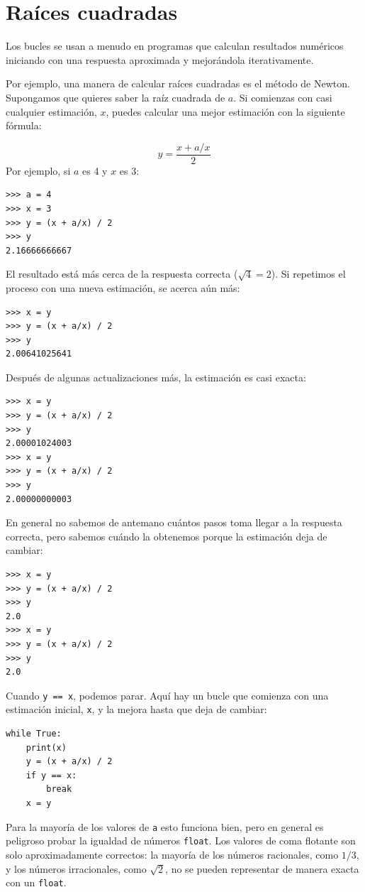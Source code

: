 \documentclass[10pt]{book}
\begin{document}
\section{Raíces cuadradas}
\label{squareroot}

Los bucles se usan a menudo en programas que calculan
resultados numéricos iniciando con una respuesta aproximada y
mejorándola iterativamente.

Por ejemplo, una manera de calcular raíces cuadradas es el método de Newton.
Supongamos que quieres saber la raíz cuadrada de $a$.  Si comienzas
con casi cualquier estimación, $x$, puedes calcular una mejor
estimación con la siguiente fórmula:

\[ y = \frac{x + a/x}{2} \]
%
Por ejemplo, si $a$ es 4 y $x$ es 3:

\begin{verbatim}
>>> a = 4
>>> x = 3
>>> y = (x + a/x) / 2
>>> y
2.16666666667
\end{verbatim}
%
El resultado está más cerca de la respuesta correcta ($\sqrt{4} = 2$).  Si
repetimos el proceso con una nueva estimación, se acerca aún más:

\begin{verbatim}
>>> x = y
>>> y = (x + a/x) / 2
>>> y
2.00641025641
\end{verbatim}
%
Después de algunas actualizaciones más, la estimación es casi exacta:

\begin{verbatim}
>>> x = y
>>> y = (x + a/x) / 2
>>> y
2.00001024003
>>> x = y
>>> y = (x + a/x) / 2
>>> y
2.00000000003
\end{verbatim}
%
En general no sabemos de antemano cuántos pasos toma
llegar a la respuesta correcta, pero sabemos cuándo la obtenemos
porque la estimación
deja de cambiar:

\begin{verbatim}
>>> x = y
>>> y = (x + a/x) / 2
>>> y
2.0
>>> x = y
>>> y = (x + a/x) / 2
>>> y
2.0
\end{verbatim}
%
Cuando {\tt y == x}, podemos parar.  Aquí hay un bucle que comienza
con una estimación inicial, {\tt x}, y la mejora hasta que
deja de cambiar:

\begin{verbatim}
while True:
    print(x)
    y = (x + a/x) / 2
    if y == x:
        break
    x = y
\end{verbatim}
%
Para la mayoría de los valores de {\tt a} esto funciona bien, pero en general es
peligroso probar la igualdad de números {\tt float}.
Los valores de coma flotante son solo aproximadamente correctos:
la mayoría de los números racionales, como $1/3$, y los números irracionales, como
$\sqrt{2}$, no se pueden representar de manera exacta con un {\tt float}.
\end{document}
